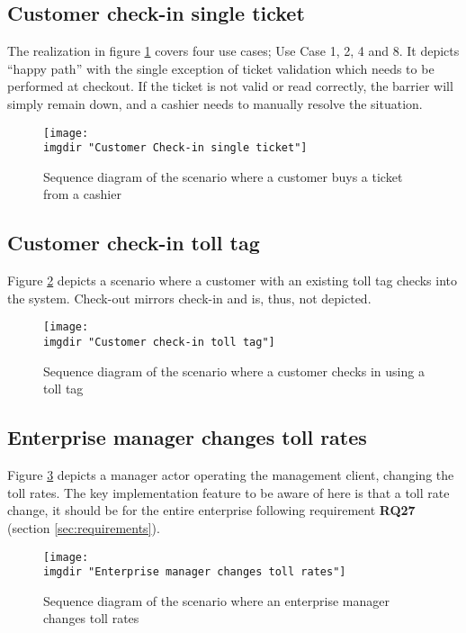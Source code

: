\subsection{Customer check-in single ticket}
The realization in figure \ref{fig:seq_diag:customer_check_in_single_ticket} covers four use cases; Use Case 1, 2, 4 and 8. It depicts ``happy path'' with the single exception of ticket validation which needs to be performed at checkout. If the ticket is not valid or read correctly, the barrier will simply remain down, and a cashier needs to manually resolve the situation.
\begin{figure}%
  \texttt{[image: \\imgdir "Customer Check-in single ticket"]}
  \caption{Sequence diagram of the scenario where a customer buys a ticket from a cashier}
  \label{fig:seq_diag:customer_check_in_single_ticket}
\end{figure}

\subsection{Customer check-in toll tag}
Figure \ref{fig:seq_diag:customer_check_in_toll_tag} depicts a scenario where a customer with an existing toll tag checks into the system. Check-out mirrors check-in and is, thus, not depicted.
\begin{figure} %
  \texttt{[image: \\imgdir "Customer check-in toll tag"]}
  \caption{Sequence diagram of the scenario where a customer checks in using a toll tag}
  \label{fig:seq_diag:customer_check_in_toll_tag}
\end{figure}

\subsection{Enterprise manager changes toll rates}
Figure \ref{fig:seq_diag:enterprise_manager_changes_toll_rates} depicts a manager actor operating the management client, changing the toll rates. The key implementation feature to be aware of here is that a toll rate change, it should be for the entire enterprise following requirement \textbf{RQ27} (section \ref{sec:requirements}).
\begin{figure} %
  \texttt{[image: \\imgdir "Enterprise manager changes toll rates"]}
  \caption{Sequence diagram of the scenario where an enterprise manager changes toll rates}
  \label{fig:seq_diag:enterprise_manager_changes_toll_rates}
\end{figure}

